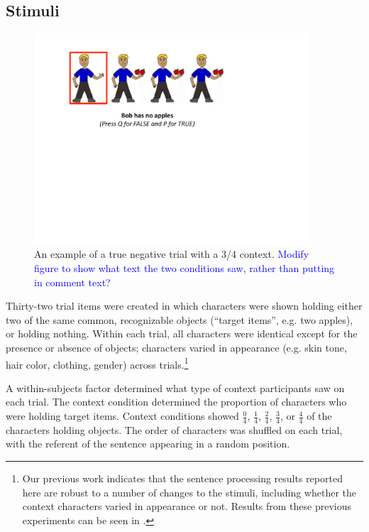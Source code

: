 \documentclass[man, noapacite]{apa2}
\begin{document}
\subsection{Stimuli}

\begin{figure}[t]
\begin{center} 
\includegraphics[width=4in]{figures/trialfig.pdf}
\caption{\label{fig:trial} An example of a true negative trial with a 3/4 context. \textcolor{blue}{Modify figure to show what text the two conditions saw, rather than putting in comment text?}}
\vspace{-5mm}
\end{center} 
\end{figure}

Thirty-two trial items were created in which characters were shown holding either two of the same common, recognizable objects (``target items'', e.g. two apples), or holding nothing.  Within each trial, all characters were identical except for the presence or absence of objects; characters varied in appearance (e.g. skin tone, hair color, clothing, gender) across trials.\footnote{Our previous work indicates that the sentence processing results reported here are robust to a number of changes to the stimuli, including whether the context characters varied in appearance or not.  Results from these previous experiments can be seen in .}

A within-subjects factor determined what type of context participants saw on each trial.  The context condition determined the proportion of characters who were holding target items.  Context conditions showed $\frac{0}{4}$, $\frac{1}{4}$, $\frac{2}{4}$, $\frac{3}{4}$, or $\frac{4}{4}$ of the characters holding objects. The order of characters was shuffled on each trial, with the referent of the sentence appearing in a random position.  
\end{document}
